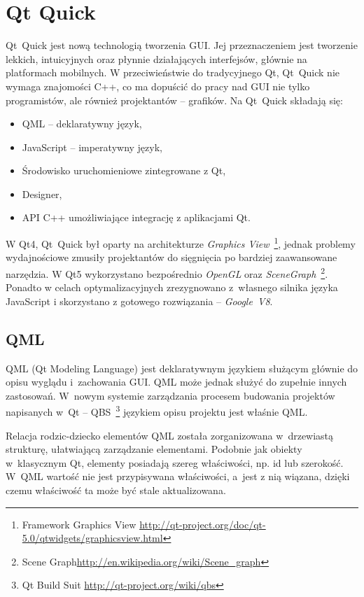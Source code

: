 \section{Qt Quick}
Qt~Quick jest nową technologią tworzenia GUI. Jej przeznaczeniem jest tworzenie lekkich, intuicyjnych oraz płynnie działających interfejsów, głównie na platformach mobilnych. W przeciwieństwie do tradycyjnego Qt, Qt~Quick nie wymaga znajomości C++, co ma dopuścić do pracy nad GUI nie tylko programistów, ale również projektantów -- grafików.
Na Qt~Quick składają się:
\begin{itemize}
\item QML -- deklaratywny język,
\item JavaScript -- imperatywny język,
\item Środowisko uruchomieniowe zintegrowane z Qt,
\item Designer,
\item API C++ umożliwiające integrację z aplikacjami Qt.
\end{itemize}

W Qt4, Qt~Quick był oparty na architekturze \textit{Graphics View}~\footnote{Framework Graphics View  \url{http://qt-project.org/doc/qt-5.0/qtwidgets/graphicsview.html}}, jednak problemy wydajnościowe zmusiły projektantów do sięgnięcia po bardziej zaawansowane narzędzia. W Qt5 wykorzystano bezpośrednio \textit{OpenGL} oraz \textit{SceneGraph}~\footnote{Scene Graph\url{http://en.wikipedia.org/wiki/Scene\_graph}}. Ponadto w celach optymalizacyjnych zrezygnowano z~własnego silnika języka JavaScript i skorzystano z gotowego rozwiązania -- \textit{Google~V8}.

\subsection{QML}
QML (Qt Modeling Language) jest deklaratywnym językiem służącym głównie do opisu wyglądu i~zachowania GUI. QML może jednak służyć do zupełnie innych zastosowań. W~nowym systemie zarządzania procesem budowania projektów napisanych w~Qt -- QBS~\footnote{Qt Build Suit \url{http://qt-project.org/wiki/qbs}} językiem opisu projektu jest właśnie QML.

Relacja rodzic-dziecko elementów QML została zorganizowana w~drzewiastą strukturę, ułatwiającą zarządzanie elementami. Podobnie jak obiekty w~klasycznym Qt, elementy posiadają szereg właściwości, np. id lub szerokość. W~QML wartość nie jest przypisywana właściwości, a~jest z nią wiązana, dzięki czemu właściwość ta może być stale aktualizowana.

